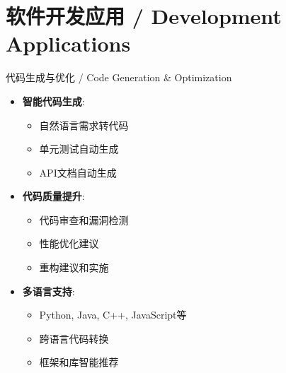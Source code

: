 \documentclass[aspectratio=169]{beamer}
\begin{document}
\section{软件开发应用 / Development Applications}

\begin{frame}{代码生成与优化 / Code Generation \& Optimization}
\begin{itemize}
    \item \textbf{智能代码生成}:
        \begin{itemize}
            \item 自然语言需求转代码
            \item 单元测试自动生成
            \item API文档自动生成
        \end{itemize}
    \item \textbf{代码质量提升}:
        \begin{itemize}
            \item 代码审查和漏洞检测
            \item 性能优化建议
            \item 重构建议和实施
        \end{itemize}
    \item \textbf{多语言支持}:
        \begin{itemize}
            \item Python, Java, C++, JavaScript等
            \item 跨语言代码转换
            \item 框架和库智能推荐
        \end{itemize}
\end{itemize}
\end{frame}
\end{document}
